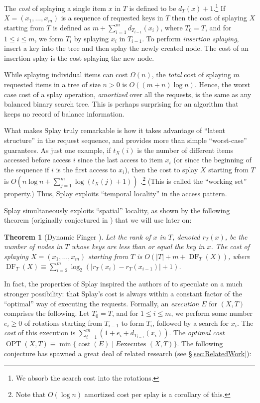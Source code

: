 \documentclass{article}
\theoremstyle{plain}
\newtheorem{theorem}{Theorem}
\theoremstyle{definition}
\DeclareMathOperator{\DF}{DF}  %
\begin{document}
%
The \emph{cost} of splaying a single item $x$ in $T$ is defined to be
$d_T(x)+1$.\footnote{We absorb the search cost into the rotations.} If
$X=(x_1,\dots,x_m)$ is a sequence of requested keys in $T$ then the cost of
splaying $X$ starting from $T$ is defined as $m+\sum_{i=1}^m d_{T_{i-1}}(x_i)$,
where $T_0=T$, and for $1\le i \le m$, we form $T_i$ by splaying $x_i$ in
$T_{i-1}$. To perform \emph{insertion splaying}, insert a key into the tree and
then splay the newly created node. The cost of an insertion splay is the cost
splaying the new node.

%
While splaying individual items can cost $\Omega(n)$, the \emph{total} cost of
splaying $m$ requested items in a tree of size $n>0$ is $O((m+n)\log n)$.
Hence, the worst case cost of a splay operation, \emph{amortized} over all the
requests, is the same as any balanced binary search tree. This is perhaps
surprising for an algorithm that keeps no record of balance information.

%
What makes Splay truly remarkable is how it takes advantage of ``latent
structure'' in the request sequence, and provides more than simple
``worst-case'' guarantees. As just one example, if $t_X(i)$ is the number of
different items accessed before access $i$ since the last access to item $x_i$
(or since the beginning of the sequence if $i$ is the first access to $x_i$),
then the cost to splay $X$ starting from $T$ is $O(n\log n
+\sum_{j=1}^m\log(t_X(j)+1))$ \cite{SPLAY_JOURNAL}.\footnote{Note that $O(\log
n)$ amortized cost per splay is a corollary of this.} (This is called the
``working set'' property.) Thus, Splay exploits ``temporal locality'' in the
access pattern.

%
Splay simultaneously exploits ``spatial'' locality, as shown by the following
theorem (originally conjectured in \cite{SPLAY_JOURNAL}) that we will use later
on:
\begin{theorem}[Dynamic Finger \cite{DYNAMIC_FINGER_1,DYNAMIC_FINGER_2}]
\label{thm:DynamicFinger}
Let the \emph{rank} of $x$ in $T$, denoted $r_T(x)$, be the number of nodes in
$T$ whose keys are less than or equal the key in $x$. The cost of splaying
$X=(x_1,\dots,x_m)$ starting from $T$ is $O(|T|+m+\DF_T(X))$, where
$\DF_T(X)\equiv\sum_{i=2}^m \log_2(|r_T(x_i)-r_T(x_{i-1})|+1)$.
\end{theorem}

%
In fact, the properties of Splay inspired the authors of \cite{SPLAY_JOURNAL}
to speculate on a much stronger possibility: that Splay's cost is always within
a constant factor of the ``optimal'' way of executing the requests. Formally,
an \emph{execution} $E$ for $(X,T)$ comprises the following. Let $T_0=T$, and
for $1\le i\le m$, we perform some number $e_i\ge 0$ of rotations starting from
$T_{i-1}$ to form $T_i$, followed by a search for $x_i$. The \emph{cost} of
this execution is $\sum_{i=1}^m(1+e_i+d_{T_{i-1}}(x_i))$. The \emph{optimal
cost} $\operatorname{OPT}(X,T)\equiv\min\{\operatorname{cost}(E)\mid\text{$E$
executes $(X,T)$}\}$. The following conjecture has spawned a great deal of
related research (see \S\ref{sec:RelatedWork}):
\end{document}
